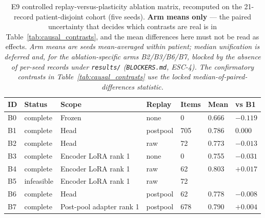 \begin{table}[t]
\centering
\small
\caption{E9 controlled replay-versus-plasticity ablation matrix, recomputed on the
21-record patient-disjoint cohort (five seeds). \textbf{Arm means only} --- the
paired uncertainty that decides which contrasts are real is in
Table~\ref{tab:causal_contrasts}, and the mean differences here must not be read
as effects. \emph{Arm means are seeds mean-averaged within patient; median
unification is deferred and, for the ablation-specific arms B2/B3/B6/B7, blocked
by the absence of per-seed records under \texttt{results/} (\texttt{BLOCKERS.md},
ESC-4). The confirmatory contrasts in Table~\ref{tab:causal_contrasts} use the
locked median-of-paired-differences statistic.}}
\label{tab:causal_ablation}
\begin{tabular}{lllllll}
\toprule
ID & Status & Scope & Replay & Items & Mean & vs B1 \\
\midrule
B0 & complete & Frozen & none & 0 & 0.666 & $-0.119$ \\
B1 & complete & Head & postpool & 705 & 0.786 & $0.000$ \\
B2 & complete & Head & raw & 72 & 0.773 & $-0.013$ \\
B3 & complete & Encoder LoRA rank 1 & none & 0 & 0.755 & $-0.031$ \\
B4 & complete & Encoder LoRA rank 1 & raw & 62 & 0.803 & $+0.017$ \\
B5 & infeasible & Encoder LoRA rank 1 & raw & 72 &  &  \\
B6 & complete & Head & postpool & 62 & 0.778 & $-0.008$ \\
B7 & complete & Post-pool adapter rank 1 & postpool & 678 & 0.790 & $+0.004$ \\
\bottomrule
\end{tabular}
\end{table}
